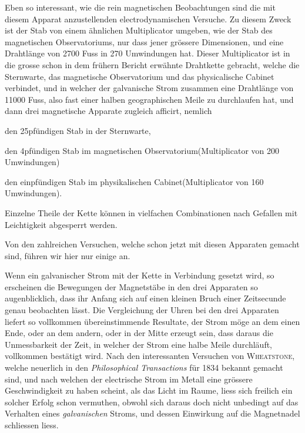 Eben so interessant, wie die rein magnetischen Beobachtungen sind die mit diesem Apparat anzustellenden electrodynamischen Versuche. Zu diesem Zweck ist der Stab von einem ähnlichen Multiplicator umgeben, wie der Stab des magnetischen Observatoriums, nur dass jener grössere Dimensionen, und eine Drahtlänge von 2700 Fuss in 270 Umwindungen hat. Dieser Multiplicator ist in die grosse schon in dem frühern Bericht erwähnte Drahtkette gebracht, welche die Sternwarte, das magnetische Observatorium und das physicalische Cabinet verbindet, und in welcher der galvanische Strom zusammen eine Drahtlänge von 11000 Fuss, also fast einer halben geographischen Meile zu durchlaufen hat, und dann drei magnetische Apparate zugleich afficirt, nemlich
\begin{list}{}{\setlength{\leftmargin}{2em}\setlength{\labelwidth}{2em}\setlength{\itemsep}{0pt}\setlength{\parsep}{0pt}}
\item[I.] den 25pfündigen Stab in der Sternwarte,
\item[II.] den 4pfündigen Stab im magnetischen Observatorium\newline (Multiplicator von 200 Umwindungen)
\item[III.] den einpfündigen Stab im physikalischen Cabinet\newline (Multiplicator von 160 Umwindungen).
\end{list}
\noindent Einzelne Theile der Kette können in vielfachen Combinationen nach Gefallen mit Leichtigkeit abgesperrt werden.

Von den zahlreichen Versuchen, welche schon jetzt mit diesen Apparaten gemacht sind, führen wir hier nur einige an.

Wenn ein galvanischer Strom mit der Kette in Verbindung gesetzt wird, so erscheinen die Bewegungen der Magnetstäbe in den drei Apparaten so augenblicklich, dass ihr Anfang sich auf einen kleinen Bruch einer Zeitsecunde genau beobachten lässt. Die Vergleichung der Uhren bei den drei Apparaten liefert so vollkommen übereinstimmende Resultate, der Strom möge an dem einen Ende, oder an dem andern, oder in der Mitte erzeugt sein, dass daraus die Unmessbarkeit der Zeit, in welcher der Strom eine halbe Meile durchläuft, vollkommen bestätigt wird. Nach den interessanten Versuchen von \textsc{Wheatstone}, welche neuerlich in den \textit{Philosophical Transactions} für 1834 bekannt gemacht sind, und nach welchen der electrische Strom im Metall eine grössere Geschwindigkeit zu haben scheint, als das Licht im Raume, liess sich freilich ein solcher Erfolg schon vermuthen, obwohl sich daraus doch nicht unbedingt auf das Verhalten eines \textit{galvanischen} Stroms, und dessen Einwirkung auf die Magnetnadel schliessen liess.


